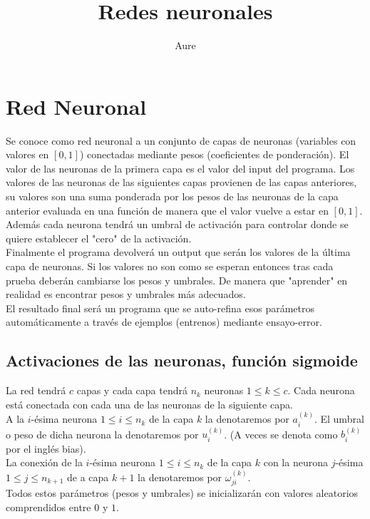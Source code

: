 \documentclass{article}
\title{Redes neuronales}
\author{Aure}
\begin{document}
\maketitle

\section{Red Neuronal}
Se conoce como red neuronal a un conjunto de capas de neuronas (variables con valores en $[0,1]$) conectadas mediante pesos (coeficientes de ponderación). El valor de las neuronas de la primera capa es el valor del input del programa. Los valores de las neuronas de las siguientes capas provienen de las capas anteriores, su valores son una suma ponderada por los pesos de las neuronas de la capa anterior evaluada en una función de manera que el valor vuelve a estar en $[0,1] $. Además cada neurona tendrá un umbral de activación para controlar donde se quiere establecer el "cero" de la activación.\\

Finalmente el programa devolverá un output que serán los valores de la última capa de neuronas. Si los valores no son como se esperan entonces tras cada prueba deberán cambiarse los pesos y umbrales. De manera que "aprender" en realidad es encontrar pesos y umbrales más adecuados.\\

El resultado final será un programa que se auto-refina esos parámetros automáticamente a través de ejemplos (entrenos) mediante ensayo-error.
\subsection{Activaciones de las neuronas, función sigmoide}
La red tendrá $c$ capas y cada capa tendrá $n_k$ neuronas $1\leq k\leq c $. Cada neurona está conectada con cada una de las neuronas de la siguiente capa.\\
A la $i$-ésima neurona $1\leq i\leq n_k $ de la capa $k$ la denotaremos por $a_i^{(k)} $. El umbral o peso de dicha neurona la denotaremos por $u_i^{(k)}$. (A veces se denota como $b_i^{(k)} $ por el inglés bias).\\
La conexión de la $i$-ésima neurona $1\leq i\leq n_k$ de la capa $k$ con la neurona $j$-ésima $1\leq j\leq n_{k+1}$ de a capa $k+1$ la denotaremos por $\omega^{(k)}_{ji} $.\\
Todos estos parámetros (pesos y umbrales) se inicializarán con valores aleatorios comprendidos entre $0$ y $1$.\\
\end{document}
